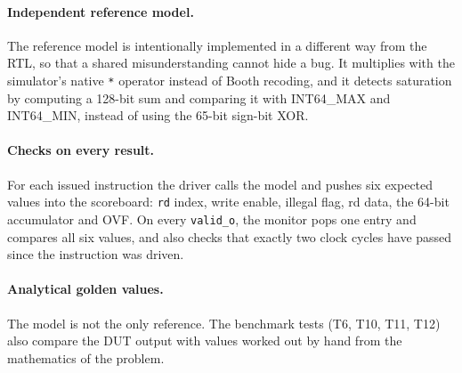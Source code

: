 \documentclass[11pt,a4paper]{report}
\newcommand{\code}[1]{\texttt{#1}}
\begin{document}
\paragraph{Independent reference model.}
The reference model is intentionally implemented in a different way from the
RTL, so that a shared misunderstanding cannot hide a bug. It multiplies with
the simulator's native \code{*} operator instead of Booth recoding, and it
detects saturation by computing a 128-bit sum and comparing it with
INT64\_MAX and INT64\_MIN, instead of using the 65-bit sign-bit XOR.

\paragraph{Checks on every result.}
For each issued instruction the driver calls the model and pushes six expected
values into the scoreboard: \code{rd} index, write enable, illegal flag, rd
data, the 64-bit accumulator and OVF. On every \code{valid\_o}, the monitor
pops one entry and compares all six values, and also checks that exactly two
clock cycles have passed since the instruction was driven.

\paragraph{Analytical golden values.}
The model is not the only reference. The benchmark tests (T6, T10, T11, T12)
also compare the DUT output with values worked out by hand from the
mathematics of the problem.
\end{document}
